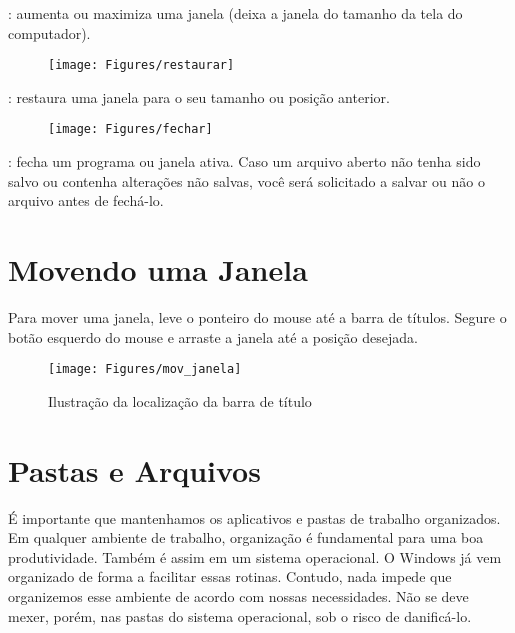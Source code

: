 \documentclass[12pt]{article}
\begin{document}
	\vspace{-1cm}{\bf Botão Maximizar}: aumenta ou maximiza uma janela (deixa a janela do tamanho da tela do computador).
	
	\begin{figure}[!h]
		\texttt{[image: Figures/restaurar]}
		\label{fig:restaurar}
	\end{figure}
	
	\vspace{-1cm}{\bf Botão Restaurar}: restaura uma janela para o seu tamanho ou posição anterior.
	
	\begin{figure}[!h]
		\texttt{[image: Figures/fechar]}
		\label{fig:fechar}
	\end{figure}
	
	\vspace{-1cm}{\bf Botão Fechar}: fecha um programa ou janela ativa. Caso um arquivo aberto não tenha sido salvo ou contenha alterações não salvas, você será solicitado a salvar ou não o arquivo antes de fechá-lo.
	
	
	\section{Movendo uma Janela}
	
	Para mover uma janela, leve o ponteiro do mouse até a barra de títulos. 	Segure o botão esquerdo do mouse e arraste a janela até a posição desejada.
	
	\begin{figure}[!h]
		\centering
		\texttt{[image: Figures/mov\_janela]}
		\caption{Ilustração da localização da barra de título}
		\label{fig:movendo janela}
		
	\end{figure}
	
	\section{Pastas e Arquivos}
	
	É importante que mantenhamos os aplicativos e pastas de trabalho organizados. Em qualquer ambiente de trabalho, organização é fundamental para uma boa produtividade. Também é assim em um sistema operacional. O Windows já vem organizado de forma a facilitar essas rotinas. Contudo, nada impede que organizemos esse ambiente de acordo com nossas necessidades. Não se deve mexer, porém, nas pastas do sistema operacional, sob o risco de danificá-lo.
\end{document}
